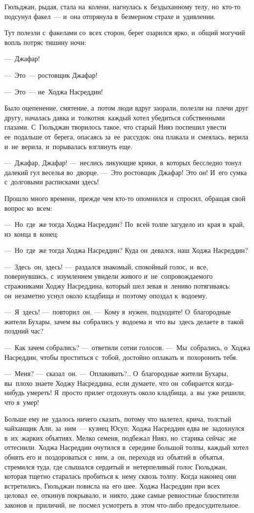\documentclass[12pt,a4paper]{book}
\begin{document}
Гюльджан, рыдая, стала на~колени, нагнулась к~бездыханному телу, но~кто-то подсунул факел~— и~она отпрянула в~безмерном страхе и~удивлении.

Тут полезли с~факелами со~всех сторон, берег озарился ярко, и~общий могучий вопль потряс тишину ночи:

—~Джафар!

—~Это~— ростовщик Джафар!

—~Это~— не~Ходжа Насреддин!

Было оцепенение, смятение, а~потом люди вдруг заорали, полезли на~плечи друг другу, началась давка и~толкотня: каждый хотел убедиться собственными глазами. С~Гюльджан творилось такое, что старый Нияз поспешил увести ее~подальше от~берега, опасаясь за~ее~рассудок: она плакала и~смеялась, верила и~не~верила, и~порывалась взглянуть еще.

—~Джафар, Джафар! —~неслись ликующие крики, в~которых бесследно тонул далекий гул веселья во~дворце. —~Это ростовщик Джафар! Это он! И~его сумка с~долговыми расписками здесь!

Прошло много времени, прежде чем кто-то опомнился и~спросил, обращая свой вопрос ко~всем:

—~Но~где~же тогда Ходжа Насреддин? По~всей толпе загудело из~края в~край, из~конца в~конец:

—~Но~где~же тогда Ходжа Насреддин? Куда он~девался, наш Ходжа Насреддин?

—~Здесь~он, здесь! —~раздался знакомый, спокойный голос, и~все, повернувшись, с~изумлением увидели живого и~не~сопровождаемого стражниками Ходжу Насреддина, который шел зевая и~лениво потягиваясь: он~незаметно уснул около кладбища и~поэтому опоздал к~водоему.

—~Я~здесь! —~повторил~он. —~Кому я~нужен, подходите! О~благородные жители Бухары, зачем вы~собрались у~водоема и~что вы~здесь делаете в~такой поздний час?

—~Как зачем собрались? —~ответили сотни голосов. —~Мы~собрались, о~Ходжа Насреддин, чтобы проститься с~тобой, достойно оплакать и~похоронить тебя.

—~Меня? —~сказал~он. —~Оплакивать?.. О~благородные жители Бухары, вы~плохо знаете Ходжу Насреддина, если думаете, что он~собирается когда-нибудь умереть! Я~просто прилег отдохнуть около кладбища, а~вы~уже решили, что я~умер!

Больше ему не~удалось ничего сказать, потому что налетел, крича, толстый чайханщик Али, за~ним~— кузнец Юсуп; Ходжа Насреддин едва не~задохнулся в~их~жарких объятиях. Мелко семеня, подбежал Нияз, но~старика сейчас~же оттеснили. Ходжа Насреддин очутился в~середине большой толпы, каждый хотел обнять его и~поздороваться с~ним, а~он, переходя из~объятий в~объятья, стремился туда, где слышался сердитый и~нетерпеливый голос Гюльджан, которая тщетно старалась пробиться к~нему сквозь толпу. Когда наконец они встретились, Гюльджан повисла на~его шее. Ходжа Насреддин при всех целовал~ее, откинув покрывало, и~никто, даже самые ревностные блюстители законов и~приличий, не~посмел усмотреть в~этом что-либо предосудительное.
\end{document}
